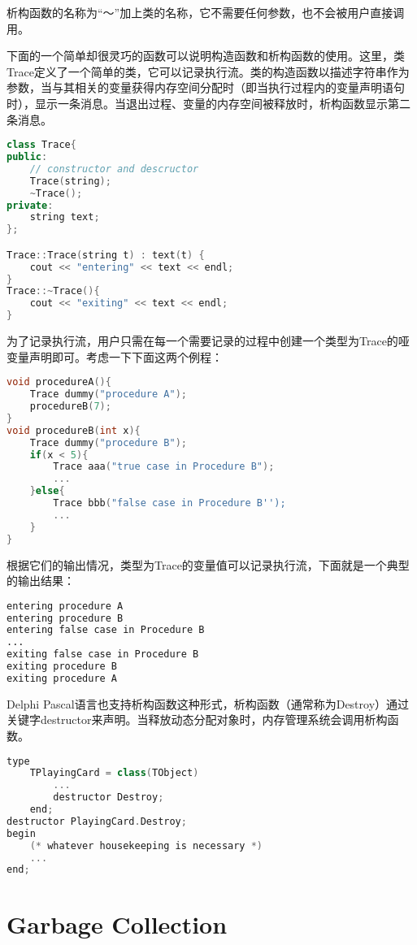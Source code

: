 析构函数的名称为“～”加上类的名称，它不需要任何参数，也不会被用户直接调用。

下面的一个简单却很灵巧的函数可以说明构造函数和析构函数的使用。这里，类Trace定义了一个简单的类，它可以记录执行流。类的构造函数以描述字符串作为参数，当与其相关的变量获得内存空间分配时（即当执行过程内的变量声明语句时），显示一条消息。当退出过程、变量的内存空间被释放时，析构函数显示第二条消息。


\begin{lstlisting}[language=C++]
class Trace{
public:
	// constructor and descructor
	Trace(string);
	~Trace();
private:
	string text;
};

Trace::Trace(string t) : text(t) {
	cout << "entering" << text << endl;
}
Trace::~Trace(){
	cout << "exiting" << text << endl;
}
\end{lstlisting}


为了记录执行流，用户只需在每一个需要记录的过程中创建一个类型为Trace的哑变量声明即可。考虑一下下面这两个例程：




\begin{lstlisting}[language=C++]
void procedureA(){
	Trace dummy("procedure A");
	procedureB(7);
}
void procedureB(int x){
	Trace dummy("procedure B");
	if(x < 5){
		Trace aaa("true case in Procedure B");
		...
	}else{
		Trace bbb("false case in Procedure B'');
		...
	}
}
\end{lstlisting}

根据它们的输出情况，类型为Trace的变量值可以记录执行流，下面就是一个典型的输出结果：



\begin{lstlisting}[language=bash]
entering procedure A
entering procedure B
entering false case in Procedure B
...
exiting false case in Procedure B
exiting procedure B
exiting procedure A
\end{lstlisting}

Delphi Pascal语言也支持析构函数这种形式，析构函数（通常称为Destroy）通过关键字destructor来声明。当释放动态分配对象时，内存管理系统会调用析构函数。



\begin{lstlisting}[language=C++]
type
	TPlayingCard = class(TObject)
		...	
		destructor Destroy;
	end;
destructor PlayingCard.Destroy;
begin
	(* whatever housekeeping is necessary *)
	...
end;
\end{lstlisting}


\section{Garbage Collection}


